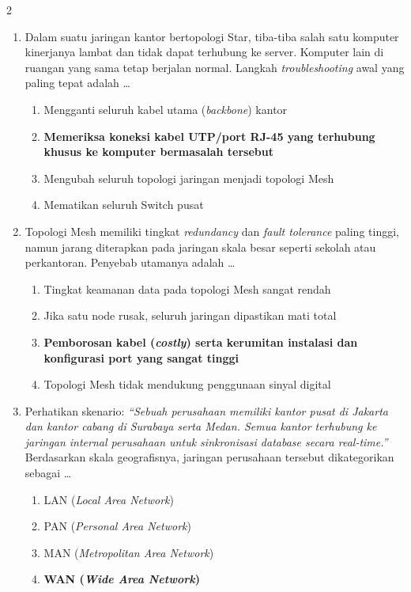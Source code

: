 \documentclass[10pt,a4paper]{article}
\begin{document}
\begin{multicols}{2}
\begin{enumerate}
    \item Dalam suatu jaringan kantor bertopologi Star, tiba-tiba salah satu komputer kinerjanya lambat dan tidak dapat terhubung ke server. Komputer lain di ruangan yang sama tetap berjalan normal. Langkah \emph{troubleshooting} awal yang paling tepat adalah \dots
    \begin{enumerate}
        \item Mengganti seluruh kabel utama (\emph{backbone}) kantor
        \item \textbf{Memeriksa koneksi kabel UTP/port RJ-45 yang terhubung khusus ke komputer bermasalah tersebut}
        \item Mengubah seluruh topologi jaringan menjadi topologi Mesh
        \item Mematikan seluruh Switch pusat
    \end{enumerate}

    \item Topologi Mesh memiliki tingkat \emph{redundancy} dan \emph{fault tolerance} paling tinggi, namun jarang diterapkan pada jaringan skala besar seperti sekolah atau perkantoran. Penyebab utamanya adalah \dots
    \begin{enumerate}
        \item Tingkat keamanan data pada topologi Mesh sangat rendah
        \item Jika satu node rusak, seluruh jaringan dipastikan mati total
        \item \textbf{Pemborosan kabel (\emph{costly}) serta kerumitan instalasi dan konfigurasi port yang sangat tinggi}
        \item Topologi Mesh tidak mendukung penggunaan sinyal digital
    \end{enumerate}

    \item Perhatikan skenario: \emph{``Sebuah perusahaan memiliki kantor pusat di Jakarta dan kantor cabang di Surabaya serta Medan. Semua kantor terhubung ke jaringan internal perusahaan untuk sinkronisasi database secara real-time.''} Berdasarkan skala geografisnya, jaringan perusahaan tersebut dikategorikan sebagai \dots
    \begin{enumerate}
        \item LAN (\emph{Local Area Network})
        \item PAN (\emph{Personal Area Network})
        \item MAN (\emph{Metropolitan Area Network})
        \item \textbf{WAN (\emph{Wide Area Network})}
    \end{enumerate}


\end{enumerate}
\end{multicols}
\end{document}
